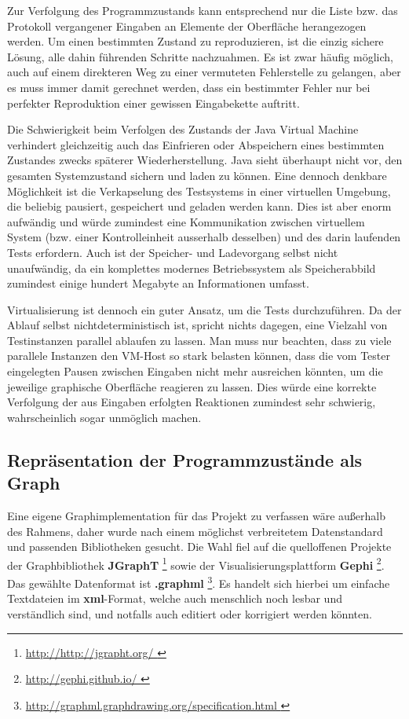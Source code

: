 Zur Verfolgung des Programmzustands kann entsprechend nur die Liste
bzw. das Protokoll vergangener Eingaben an Elemente der Oberfläche
herangezogen werden. Um einen bestimmten Zustand zu reproduzieren,
ist die einzig sichere Lösung, alle dahin führenden Schritte nachzuahmen.
Es ist zwar häufig möglich, auch auf einem direkteren Weg zu einer
vermuteten Fehlerstelle zu gelangen, aber es muss immer damit gerechnet
werden, dass ein bestimmter Fehler nur bei perfekter Reproduktion
einer gewissen Eingabekette auftritt. 

Die Schwierigkeit beim
Verfolgen des Zustands der Java Virtual Machine verhindert
gleichzeitig auch das Einfrieren oder Abspeichern eines bestimmten Zustandes
zwecks späterer Wiederherstellung. Java sieht überhaupt nicht vor,
den gesamten Systemzustand sichern und laden zu können. Eine dennoch
denkbare Möglichkeit ist die Verkapselung des Testsystems in einer
virtuellen Umgebung, die beliebig pausiert, gespeichert und geladen
werden kann. Dies ist aber enorm aufwändig und würde zumindest eine
Kommunikation zwischen virtuellem System (bzw. einer Kontrolleinheit
ausserhalb desselben) und des darin laufenden Tests erfordern.
Auch ist der Speicher- und Ladevorgang selbst nicht unaufwändig,
da ein komplettes modernes Betriebssystem als Speicherabbild zumindest einige hundert
Megabyte an Informationen umfasst.

Virtualisierung ist dennoch ein guter Ansatz, um die Tests
durchzuführen. Da der Ablauf selbst nichtdeterministisch ist,
spricht nichts dagegen, eine Vielzahl von Testinstanzen parallel ablaufen zu
lassen. Man muss nur beachten, dass zu viele parallele Instanzen den VM-Host
so stark belasten können, dass die vom Tester eingelegten Pausen
zwischen Eingaben nicht mehr ausreichen könnten, um die jeweilige graphische
Oberfläche reagieren zu lassen. Dies würde eine korrekte Verfolgung
der aus Eingaben erfolgten Reaktionen zumindest sehr schwierig,
wahrscheinlich sogar unmöglich machen.


\subsection{Repräsentation der Programmzustände als Graph}

Eine eigene Graphimplementation für das Projekt zu verfassen wäre
außerhalb des Rahmens, daher wurde nach einem möglichst verbreitetem
Datenstandard und passenden Bibliotheken gesucht. Die Wahl fiel auf
die quelloffenen Projekte der Graphbibliothek \textbf{JGraphT} \footnote{\url{ http://http://jgrapht.org/ }} 
sowie der Visualisierungsplattform \textbf{Gephi} \footnote{\url{ http://gephi.github.io/ }}.
Das gewählte Datenformat ist \textbf{.graphml} \footnote{\url{ http://graphml.graphdrawing.org/specification.html }}.
Es handelt sich hierbei um einfache Textdateien im \textbf{xml}-Format,
welche auch menschlich noch lesbar und verständlich sind, und notfalls
auch editiert oder korrigiert werden könnten. 

